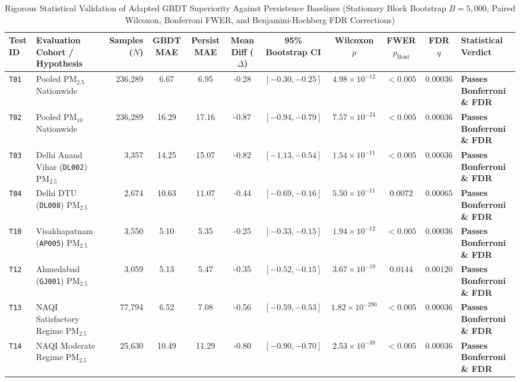 \begin{table}[t]
\caption{Rigorous Statistical Validation of Adapted GBDT Superiority Against Persistence Baselines (Stationary Block Bootstrap $B=5,000$, Paired Wilcoxon, Bonferroni FWER, and Benjamini-Hochberg FDR Corrections)}
\label{tab:statistical_tests}
\centering
\scriptsize
\begin{tabular}{llrcccccccl}
\toprule
\textbf{Test ID} & \textbf{Evaluation Cohort / Hypothesis} & \textbf{Samples ($N$)} & \textbf{GBDT MAE} & \textbf{Persist MAE} & \textbf{Mean Diff ($\Delta$)} & \textbf{95\% Bootstrap CI} & \textbf{Wilcoxon $p$} & \textbf{FWER $p_{\text{Bonf}}$} & \textbf{FDR $q$} & \textbf{Statistical Verdict} \\
\midrule
\texttt{T01} & Pooled $\text{PM}_{2.5}$ Nationwide & 236,289 & 6.67 & 6.95 & -0.28 & $[-0.30, -0.25]$ & $4.98 \times 10^{-12}$ & $<0.005$ & $0.00036$ & \textbf{Passes Bonferroni \& FDR} \\
\texttt{T02} & Pooled $\text{PM}_{10}$ Nationwide & 236,289 & 16.29 & 17.16 & -0.87 & $[-0.94, -0.79]$ & $7.57 \times 10^{-24}$ & $<0.005$ & $0.00036$ & \textbf{Passes Bonferroni \& FDR} \\
\texttt{T03} & Delhi Anand Vihar (\texttt{DL002}) $\text{PM}_{2.5}$ & 3,357 & 14.25 & 15.07 & -0.82 & $[-1.13, -0.54]$ & $1.54 \times 10^{-11}$ & $<0.005$ & $0.00036$ & \textbf{Passes Bonferroni \& FDR} \\
\texttt{T04} & Delhi DTU (\texttt{DL008}) $\text{PM}_{2.5}$ & 2,674 & 10.63 & 11.07 & -0.44 & $[-0.69, -0.16]$ & $5.50 \times 10^{-11}$ & $0.0072$ & $0.00065$ & \textbf{Passes Bonferroni \& FDR} \\
\texttt{T10} & Visakhapatnam (\texttt{AP005}) $\text{PM}_{2.5}$ & 3,550 & 5.10 & 5.35 & -0.25 & $[-0.33, -0.15]$ & $1.94 \times 10^{-12}$ & $<0.005$ & $0.00036$ & \textbf{Passes Bonferroni \& FDR} \\
\texttt{T12} & Ahmedabad (\texttt{GJ001}) $\text{PM}_{2.5}$ & 3,059 & 5.13 & 5.47 & -0.35 & $[-0.52, -0.15]$ & $3.67 \times 10^{-19}$ & $0.0144$ & $0.00120$ & \textbf{Passes Bonferroni \& FDR} \\
\texttt{T13} & NAQI Satisfactory Regime $\text{PM}_{2.5}$ & 77,794 & 6.52 & 7.08 & -0.56 & $[-0.59, -0.53]$ & $1.82 \times 10^{-290}$ & $<0.005$ & $0.00036$ & \textbf{Passes Bonferroni \& FDR} \\
\texttt{T14} & NAQI Moderate Regime $\text{PM}_{2.5}$ & 25,630 & 10.49 & 11.29 & -0.80 & $[-0.90, -0.70]$ & $2.53 \times 10^{-38}$ & $<0.005$ & $0.00036$ & \textbf{Passes Bonferroni \& FDR} \\

\end{tabular}
\end{table}
